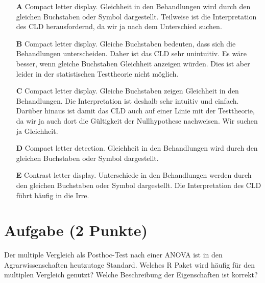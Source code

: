 \documentclass[a4paper, 9pt]{scrartcl}\usepackage[]{graphicx}\usepackage[]{xcolor}
\begin{document}
\begin{enumerate}
\item [\textbf{A} \msquare] Compact letter display. Gleichheit in den Behandlungen wird durch den gleichen Buchstaben oder Symbol dargestellt. Teilweise ist die Interpretation des CLD herausfordernd, da wir ja nach dem Unterschied suchen.
\item [\textbf{B} \msquare] Compact letter display. Gleiche Buchstaben bedeuten, dass sich die Behandlungen unterscheiden. Daher ist das CLD sehr unintuitiv. Es wäre besser, wenn gleiche Buchstaben Gleichheit anzeigen würden. Dies ist aber leider in der statistischen Testtheorie nicht möglich.
\item [\textbf{C} \msquare] Compact letter display. Gleiche Buchstaben zeigen Gleichheit in den Behandlungen. Die Interpretation ist deshalb sehr intuitiv und einfach. Darüber hinaus ist damit das CLD auch auf einer Linie mit der Testtheorie, da wir ja auch dort die Gültigkeit der Nullhypothese nachweisen. Wir suchen ja Gleichheit.
\item [\textbf{D} \msquare] Compact letter detection. Gleichheit in den Behandlungen wird durch den gleichen Buchstaben oder Symbol dargestellt.
\item [\textbf{E} \msquare] Contrast letter display. Unterschiede in den Behandlungen werden durch den gleichen Buchstaben oder Symbol dargestellt. Die Interpretation des CLD führt häufig in die Irre.
\end{enumerate}

\section{Aufgabe \hfill (2 Punkte)}




Der multiple Vergleich als Posthoc-Test nach einer ANOVA ist in den Agrarwissenschaften heutzutage Standard. Welches R Paket wird häufig für den multiplen Vergleich genutzt? Welche Beschreibung der Eigenschaften ist korrekt?
\end{document}
